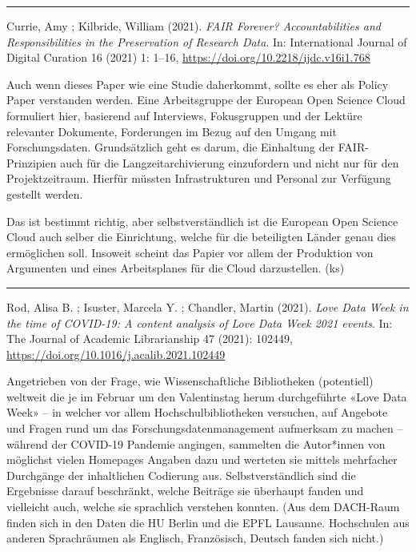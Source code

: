 \documentclass[a4paper,
fontsize=11pt,
oneside,
numbers=noperiodatend,
parskip=half-,
bibliography=totoc,
final
]{scrartcl}
\begin{document}
\begin{center}\rule{0.5\linewidth}{0.5pt}\end{center}

Currie, Amy ; Kilbride, William (2021). \emph{FAIR Forever?
Accountabilities and Responsibilities in the Preservation of Research
Data}. In: International Journal of Digital Curation 16 (2021) 1: 1--16,
\url{https://doi.org/10.2218/ijdc.v16i1.768}

Auch wenn dieses Paper wie eine Studie daherkommt, sollte es eher als
Policy Paper verstanden werden. Eine Arbeitsgruppe der European Open
Science Cloud formuliert hier, basierend auf Interviews, Fokusgruppen
und der Lektüre relevanter Dokumente, Forderungen im Bezug auf den
Umgang mit Forschungsdaten. Grundsätzlich geht es darum, die Einhaltung
der FAIR-Prinzipien auch für die Langzeitarchivierung einzufordern und
nicht nur für den Projektzeitraum. Hierfür müssten Infrastrukturen und
Personal zur Verfügung gestellt werden.

Das ist bestimmt richtig, aber selbstverständlich ist die European Open
Science Cloud auch selber die Einrichtung, welche für die beteiligten
Länder genau dies ermöglichen soll. Insoweit scheint das Papier vor
allem der Produktion von Argumenten und eines Arbeitsplanes für die
Cloud darzustellen. (ks)

\begin{center}\rule{0.5\linewidth}{0.5pt}\end{center}

Rod, Alisa B. ; Isuster, Marcela Y. ; Chandler, Martin (2021).
\emph{Love Data Week in the time of COVID-19: A content analysis of Love
Data Week 2021 events}. In: The Journal of Academic Librarianship 47
(2021): 102449, \url{https://doi.org/10.1016/j.acalib.2021.102449}

Angetrieben von der Frage, wie Wissenschaftliche Bibliotheken
(potentiell) weltweit die je im Februar um den Valentinstag herum
durchgeführte «Love Data Week» -- in welcher vor allem
Hochschulbibliotheken versuchen, auf Angebote und Fragen rund um das
Forschungsdatenmanagement aufmerksam zu machen -- während der COVID-19
Pandemie angingen, sammelten die Autor*innen von möglichst vielen
Homepages Angaben dazu und werteten sie mittels mehrfacher Durchgänge
der inhaltlichen Codierung aus. Selbstverständlich sind die Ergebnisse
darauf beschränkt, welche Beiträge sie überhaupt fanden und vielleicht
auch, welche sie sprachlich verstehen konnten. (Aus dem DACH-Raum finden
sich in den Daten die HU Berlin und die EPFL Lausanne. Hochschulen aus
anderen Sprachräumen als Englisch, Französisch, Deutsch fanden sich
nicht.)
\end{document}
